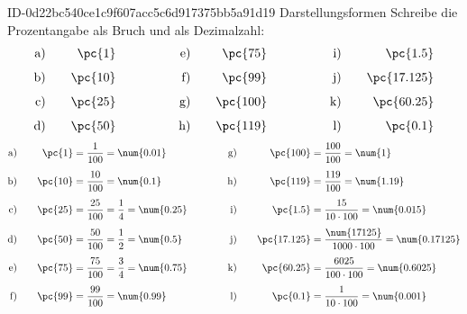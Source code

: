 \begin{exercise}
      {ID-0d22bc540ce1c9f607acc5c6d917375bb5a91d19}
      {Darstellungsformen}
  \ifproblem\problem
    Schreibe die Prozentangabe als Bruch und als Dezimalzahl:
    \begin{alignat*}{6}
      \text{a)}&\quad & \text{\pc{1}}&\qquad\qquad  & \text{e)}&\quad & \text{\pc{75}}&\qquad\qquad  & \text{i)}&\quad & \text{\pc{1.5}}&    \\[1ex]
      \text{b)}&\quad & \text{\pc{10}}&\qquad\qquad & \text{f)}&\quad & \text{\pc{99}}&\qquad\qquad  & \text{j)}&\quad & \text{\pc{17.125}}& \\[1ex]
      \text{c)}&\quad & \text{\pc{25}}&\qquad\qquad & \text{g)}&\quad & \text{\pc{100}}&\qquad\qquad & \text{k)}&\quad & \text{\pc{60.25}}&  \\[1ex]
      \text{d)}&\quad & \text{\pc{50}}&\qquad\qquad & \text{h)}&\quad & \text{\pc{119}}&\qquad\qquad & \text{l)}&\quad & \text{\pc{0.1}}&
    \end{alignat*}
  \fi
  \ifoutcome\outcome
    \begin{alignat*}{4}
      \text{a)}&\quad & \text{\pc{1}}&=\frac{1}{100}=\num{0.01}               & \qquad\quad\text{g)}&\quad & \text{\pc{100}}&=\frac{100}{100}=\num{1}                           \\[1ex]
      \text{b)}&\quad & \text{\pc{10}}&=\frac{10}{100}=\num{0.1}              & \qquad\quad\text{h)}&\quad & \text{\pc{119}}&=\frac{119}{100}=\num{1.19}                        \\[1ex]
      \text{c)}&\quad & \text{\pc{25}}&=\frac{25}{100}=\frac{1}{4}=\num{0.25} & \qquad\quad\text{i)}&\quad & \text{\pc{1.5}}&=\frac{15}{10\cdot100}=\num{0.015}                 \\[1ex]
      \text{d)}&\quad & \text{\pc{50}}&=\frac{50}{100}=\frac{1}{2}=\num{0.5}  & \qquad\quad\text{j)}&\quad & \text{\pc{17.125}}&=\frac{\num{17125}}{1000\cdot100}=\num{0.17125} \\[1ex]
      \text{e)}&\quad & \text{\pc{75}}&=\frac{75}{100}=\frac{3}{4}=\num{0.75} & \qquad\quad\text{k)}&\quad & \text{\pc{60.25}}&=\frac{6025}{100\cdot100}=\num{0.6025}           \\[1ex]
      \text{f)}&\quad & \text{\pc{99}}&=\frac{99}{100}=\num{0.99}             & \qquad\quad\text{l)}&\quad & \text{\pc{0.1}}&=\frac{1}{10\cdot100}=\num{0.001}
    \end{alignat*}
  \fi
\end{exercise}
